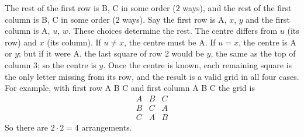 The rest of the first row is B, C in some order ($2$ ways), and the rest of the first column is B, C in some order ($2$ ways). Say the first row is A, $x$, $y$ and the first column is A, $u$, $w$. These choices determine the rest. The centre differs from $u$ (its row) and $x$ (its column). If $u\ne x$, the centre must be A. If $u=x$, the centre is A or $y$; but if it were A, the last square of row $2$ would be $y$, the same as the top of column $3$; so the centre is $y$. Once the centre is known, each remaining square is the only letter missing from its row, and the result is a valid grid in all four cases. For example, with first row A B C and first column A B C the grid is
\[\begin{array}{ccc}A&B&C\\B&C&A\\C&A&B\end{array}\]
So there are $2\cdot2=\boxed{4}$ arrangements.
